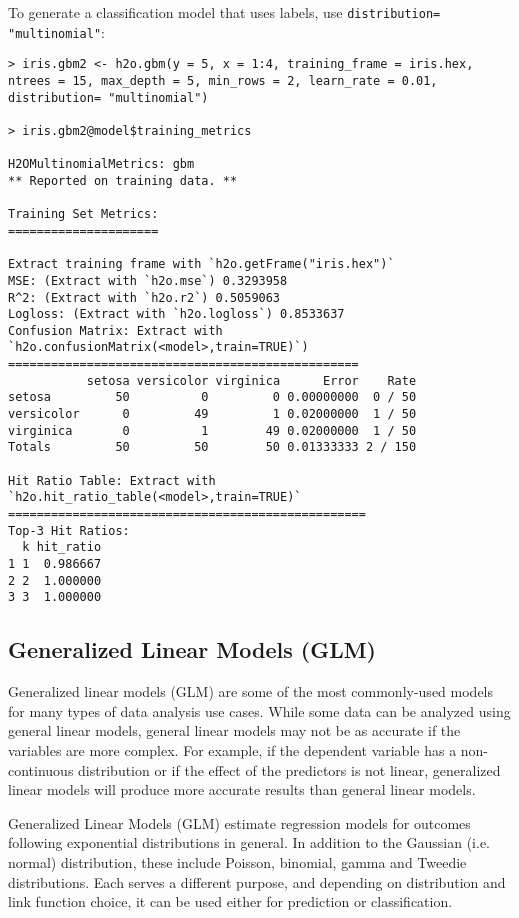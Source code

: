 {{To generate a classification model that uses labels, use {\texttt{distribution= "multinomial"}}:


\waterExampleInR
\medskip

\begin{lstlisting}[style=R]
> iris.gbm2 <- h2o.gbm(y = 5, x = 1:4, training_frame = iris.hex, ntrees = 15, max_depth = 5, min_rows = 2, learn_rate = 0.01, distribution= "multinomial")
   
> iris.gbm2@model$training_metrics

H2OMultinomialMetrics: gbm
** Reported on training data. **

Training Set Metrics: 
=====================

Extract training frame with `h2o.getFrame("iris.hex")`
MSE: (Extract with `h2o.mse`) 0.3293958
R^2: (Extract with `h2o.r2`) 0.5059063
Logloss: (Extract with `h2o.logloss`) 0.8533637
Confusion Matrix: Extract with `h2o.confusionMatrix(<model>,train=TRUE)`)
=================================================
           setosa versicolor virginica      Error    Rate
setosa         50          0         0 0.00000000  0 / 50
versicolor      0         49         1 0.02000000  1 / 50
virginica       0          1        49 0.02000000  1 / 50
Totals         50         50        50 0.01333333 2 / 150

Hit Ratio Table: Extract with `h2o.hit_ratio_table(<model>,train=TRUE)`
==================================================
Top-3 Hit Ratios:
  k hit_ratio
1 1  0.986667
2 2  1.000000
3 3  1.000000

\end{lstlisting}


\subsection{Generalized Linear Models (GLM)}


Generalized linear models (GLM) are some of the most commonly-used models for many types of data analysis use cases. While some data can be analyzed using general linear models, general linear models may not be as accurate if the variables are more complex. For example, if the dependent variable has a non-continuous distribution or if the effect of the predictors is not linear, generalized linear models will produce more accurate results than general linear models.

Generalized Linear Models (GLM) estimate regression models for outcomes following exponential distributions in general. In addition to the Gaussian (i.e. normal) distribution, these include Poisson, binomial, gamma and Tweedie distributions. Each serves a different purpose, and depending on distribution and link function choice, it can be used either for prediction or classification.

}}
